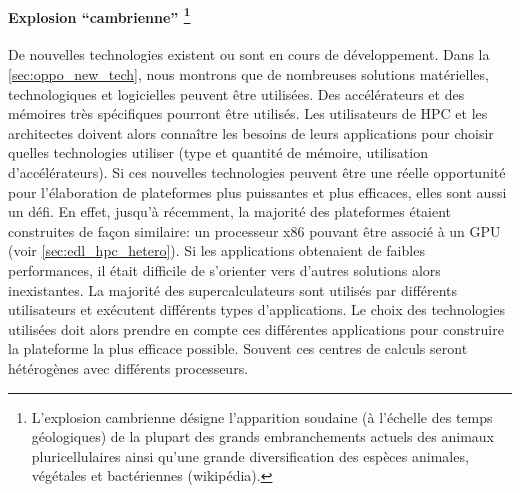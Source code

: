         

        \paragraph[Explosion cambrienne] {Explosion ``cambrienne'' \footnote{L’explosion cambrienne désigne l'apparition soudaine (à l'échelle des temps géologiques) de la plupart des grands embranchements actuels des animaux pluricellulaires ainsi qu'une grande diversification des espèces animales, végétales et bactériennes (wikipédia).}}
        
            De nouvelles technologies existent ou sont en cours de développement. Dans la \autoref{sec:oppo_new_tech}, nous montrons que de nombreuses solutions matérielles, technologiques et logicielles peuvent être utilisées. Des accélérateurs et des mémoires très spécifiques pourront être utilisés. Les utilisateurs de HPC et les architectes doivent alors connaître les besoins de leurs applications pour choisir quelles technologies utiliser (type et quantité de mémoire, utilisation d'accélérateurs). Si ces nouvelles technologies peuvent être une réelle opportunité pour l'élaboration de plateformes plus puissantes et plus efficaces, elles sont aussi un défi. En effet, jusqu’à récemment, la majorité des plateformes étaient construites de façon similaire: un processeur x86 pouvant être associé à un GPU (voir \autoref{sec:edl_hpc_hetero}). Si les applications obtenaient de faibles performances, il était difficile de s'orienter vers d'autres solutions alors inexistantes. La majorité des supercalculateurs sont utilisés par différents utilisateurs et exécutent différents types d'applications. Le choix des technologies utilisées doit alors prendre en compte ces différentes applications pour construire la plateforme la plus efficace possible. Souvent ces centres de calculs seront hétérogènes avec différents processeurs.
        
